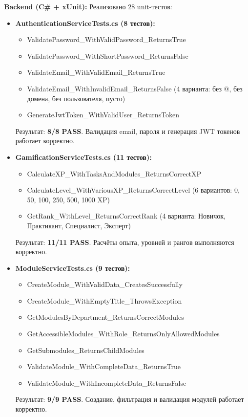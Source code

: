 \textbf{Backend (C\# + xUnit):} Реализовано 28 unit-тестов:
\begin{itemize}
	\item \textbf{AuthenticationServiceTests.cs (8 тестов):}
	\begin{itemize}
		\item ValidatePassword\_WithValidPassword\_ReturnsTrue
		\item ValidatePassword\_WithShortPassword\_ReturnsFalse
		\item ValidateEmail\_WithValidEmail\_ReturnsTrue
		\item ValidateEmail\_WithInvalidEmail\_ReturnsFalse (4 варианта: без @, без домена, без пользователя, пусто)
		\item GenerateJwtToken\_WithValidUser\_ReturnsToken
	\end{itemize}
	Результат: \textbf{8/8 PASS}. Валидация email, пароля и генерация JWT токенов работает корректно.
	
	\item \textbf{GamificationServiceTests.cs (11 тестов):}
	\begin{itemize}
		\item CalculateXP\_WithTasksAndModules\_ReturnsCorrectXP
		\item CalculateLevel\_WithVariousXP\_ReturnsCorrectLevel (6 вариантов: 0, 50, 100, 250, 500, 1000 XP)
		\item GetRank\_WithLevel\_ReturnsCorrectRank (4 варианта: Новичок, Практикант, Специалист, Эксперт)
	\end{itemize}
	Результат: \textbf{11/11 PASS}. Расчёты опыта, уровней и рангов выполняются корректно.
	
	\item \textbf{ModuleServiceTests.cs (9 тестов):}
	\begin{itemize}
		\item CreateModule\_WithValidData\_CreatesSuccessfully
		\item CreateModule\_WithEmptyTitle\_ThrowsException
		\item GetModulesByDepartment\_ReturnsCorrectModules
		\item GetAccessibleModules\_WithRole\_ReturnsOnlyAllowedModules
		\item GetSubmodules\_ReturnsChildModules
		\item ValidateModule\_WithCompleteData\_ReturnsTrue
		\item ValidateModule\_WithIncompleteData\_ReturnsFalse
	\end{itemize}
	Результат: \textbf{9/9 PASS}. Создание, фильтрация и валидация модулей работает корректно.
\end{itemize}

